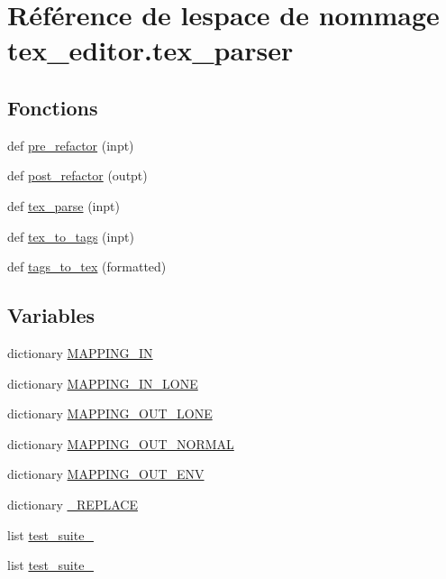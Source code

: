 \hypertarget{namespacetex__editor_1_1tex__parser}{}\section{Référence de l\textquotesingle{}espace de nommage tex\+\_\+editor.\+tex\+\_\+parser}
\label{namespacetex__editor_1_1tex__parser}
\subsection*{Fonctions}
\begin{DoxyCompactItemize}
\item 
def \hyperlink{namespacetex__editor_1_1tex__parser_a58a42ed389b44183c51b29678927dcf4}{pre\+\_\+refactor} (inpt)
\item 
def \hyperlink{namespacetex__editor_1_1tex__parser_a3c9dc90a3f669ba9901cad0e1eb9fb14}{post\+\_\+refactor} (outpt)
\item 
def \hyperlink{namespacetex__editor_1_1tex__parser_aa45bb45171acbdcb0fc4f11f233324de}{tex\+\_\+parse} (inpt)
\item 
def \hyperlink{namespacetex__editor_1_1tex__parser_a4e9cfd4519c62659ac9a45aef9f7c9f2}{tex\+\_\+to\+\_\+tags} (inpt)
\item 
def \hyperlink{namespacetex__editor_1_1tex__parser_ad93c436c717eb1690305e71ffda5a814}{tags\+\_\+to\+\_\+tex} (formatted)
\end{DoxyCompactItemize}
\subsection*{Variables}
\begin{DoxyCompactItemize}
\item 
dictionary \hyperlink{namespacetex__editor_1_1tex__parser_a0b8e21ec116f7e53f3d4858c996694e8}{M\+A\+P\+P\+I\+N\+G\+\_\+\+I\+N}
\item 
dictionary \hyperlink{namespacetex__editor_1_1tex__parser_a14298f87033d99150129b74f82d484de}{M\+A\+P\+P\+I\+N\+G\+\_\+\+I\+N\+\_\+\+L\+O\+N\+E}
\item 
dictionary \hyperlink{namespacetex__editor_1_1tex__parser_a740e1c1c007458cc3eadbdb1b09a09f8}{M\+A\+P\+P\+I\+N\+G\+\_\+\+O\+U\+T\+\_\+\+L\+O\+N\+E}
\item 
dictionary \hyperlink{namespacetex__editor_1_1tex__parser_aef4f62751db8b39566d55b4bf5fcc645}{M\+A\+P\+P\+I\+N\+G\+\_\+\+O\+U\+T\+\_\+\+N\+O\+R\+M\+A\+L}
\item 
dictionary \hyperlink{namespacetex__editor_1_1tex__parser_ab7ad6067629950c1f03f0609a767a1bd}{M\+A\+P\+P\+I\+N\+G\+\_\+\+O\+U\+T\+\_\+\+E\+N\+V}
\item 
dictionary \hyperlink{namespacetex__editor_1_1tex__parser_a13bf27f0d2ae8b7ba43c1704aed98887}{\+\_\+\+R\+E\+P\+L\+A\+C\+E}
\item 
list \hyperlink{namespacetex__editor_1_1tex__parser_a9ca879b111fa4dbe32b476e800622f81}{test\+\_\+suite\+\_}
\item 
list \hyperlink{namespacetex__editor_1_1tex__parser_a5a98061bf500c69335751b0fc2cfc818}{test\+\_\+suite\+\_}
\end{DoxyCompactItemize}


